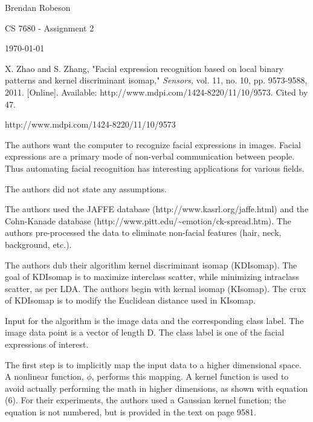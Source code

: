 \documentclass[11pt]{article}
\begin{document}
\noindent Brendan Robeson

\noindent CS 7680 - Assignment 2

\noindent \today

\medskip

\begin{description}[leftmargin=0in]
    \item [Source] X. Zhao and S. Zhang, "Facial expression recognition based on
        local binary patterns and kernel discriminant isomap," \emph{Sensors,}
        vol. 11, no. 10, pp. 9573-9588, 2011. [Online]. Available:
        http://www.mdpi.com/1424-8220/11/10/9573. Cited by 47.

    \item [URL] http://www.mdpi.com/1424-8220/11/10/9573

    \item [Problem] The authors want the computer to recognize facial
        expressions in images. Facial expressions are a primary mode of
        non-verbal communication between people. Thus automating facial
        recognition has interesting applications for various fields.

    \item [Assumptions] The authors did not state any assumptions.

    \item [Data Sets] The authors used the JAFFE database
        (http://www.kasrl.org/jaffe.html) and the Cohn-Kanade database
        (http://www.pitt.edu/\~{}emotion/ck-spread.htm). The authors
        pre-processed the data to eliminate non-facial features (hair, neck,
        background, etc.).

    \item [Algorithm Overview] The authors dub their algorithm kernel
        discriminant isomap (KDIsomap). The goal of KDIsomap is to maximize
        interclass scatter, while minimizing intraclass scatter, as per LDA. The
        authors begin with kernal isomap (KIsomap). The crux of KDIsomap is to
        modify the Euclidean distance used in KIsomap.

        Input for the algorithm is the image data and the corresponding class
        label. The image data point is a vector of length D. The class label is
        one of the facial expressions of interest.

        The first step is to implicitly map the input data to a higher dimensional
        space. A nonlinear function, \(\phi\), performs this mapping. A kernel
        function is used to avoid actually performing the math in higher
        dimensions, as shown with equation (6). For their experiments, the
        authors used a Gaussian kernel function; the equation is not numbered,
        but is provided in the text on page 9581.


\end{description}
\end{document}
